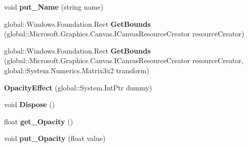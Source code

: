 \begin{DoxyCompactItemize}
void {\bfseries put\+\_\+\+Name} (string name)
\item 
\mbox{\label{class_microsoft_1_1_graphics_1_1_canvas_1_1_effects_1_1_opacity_effect_a8bf0901a94b4839c766e269bfa8a8549}} 
global\+::\+Windows.\+Foundation.\+Rect {\bfseries Get\+Bounds} (global\+::\+Microsoft.\+Graphics.\+Canvas.\+I\+Canvas\+Resource\+Creator resource\+Creator)
\item 
\mbox{\label{class_microsoft_1_1_graphics_1_1_canvas_1_1_effects_1_1_opacity_effect_ae3afb2721cc2938d2730bfcfdab779d2}} 
global\+::\+Windows.\+Foundation.\+Rect {\bfseries Get\+Bounds} (global\+::\+Microsoft.\+Graphics.\+Canvas.\+I\+Canvas\+Resource\+Creator resource\+Creator, global\+::\+System.\+Numerics.\+Matrix3x2 transform)
\item 
\mbox{\label{class_microsoft_1_1_graphics_1_1_canvas_1_1_effects_1_1_opacity_effect_a637fb4e2ccc14281dc718c4623e0343c}} 
{\bfseries Opacity\+Effect} (global\+::\+System.\+Int\+Ptr dummy)
\item 
\mbox{\label{class_microsoft_1_1_graphics_1_1_canvas_1_1_effects_1_1_opacity_effect_a1246fe8a73f548e85044aa9a5849aabc}} 
void {\bfseries Dispose} ()
\item 
\mbox{\label{class_microsoft_1_1_graphics_1_1_canvas_1_1_effects_1_1_opacity_effect_a3a7a9f455303d589535bffc1fbff1ed7}} 
float {\bfseries get\+\_\+\+Opacity} ()
\item 
\mbox{\label{class_microsoft_1_1_graphics_1_1_canvas_1_1_effects_1_1_opacity_effect_a12edc59773ce19245163b1e4f33ab94a}} 
void {\bfseries put\+\_\+\+Opacity} (float value)
\item 
\mbox{\label{class_microsoft_1_1_graphics_1_1_canvas_1_1_effects_1_1_opacity_effect_a2d98ab034bde8cfb8102ebc23ccf5f02}} 

\end{DoxyCompactItemize}
